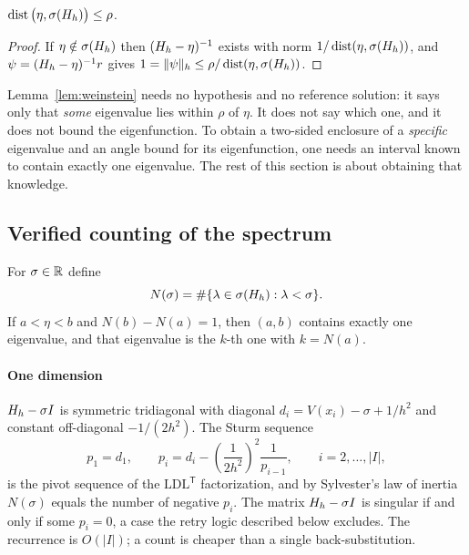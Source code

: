 \begin{lemma}\label{lem:weinstein}
  $\operatorname{dist}\big(\eta,\sigma(H_h)\big)\le \rho$.
\end{lemma}
\begin{proof}
  If $\eta\notin\sigma(H_h)$ then $(H_h-\eta)^{-1}$ exists with norm
  $1/\operatorname{dist}(\eta,\sigma(H_h))$, and
  $\psi=(H_h-\eta)^{-1}r$ gives
  $1=\lVert \psi\rVert_h\le \rho/\operatorname{dist}(\eta,\sigma(H_h))$.
\end{proof}

Lemma~\ref{lem:weinstein} needs no hypothesis and no reference solution: it
says only that \emph{some} eigenvalue lies within $\rho$ of $\eta$. It does
not say which one, and it does not bound the eigenfunction. To obtain a
two-sided enclosure of a \emph{specific} eigenvalue and an angle bound for its
eigenfunction, one needs an interval known to contain exactly one eigenvalue.
The rest of this section is about obtaining that knowledge.

\subsection{Verified counting of the spectrum}
\label{sec:counting}

For $\sigma\in\mathbb{R}$ define
\begin{equation}
  N(\sigma) = \#\{\lambda\in\sigma(H_h): \lambda<\sigma\}.
\end{equation}
If $a<\eta<b$ and $N(b)-N(a)=1$, then $(a,b)$ contains exactly one
eigenvalue, and that eigenvalue is the $k$-th one with $k=N(a)$.

\paragraph{One dimension} $H_h-\sigma I$ is symmetric tridiagonal with
diagonal $d_i=V(x_i)-\sigma+1/h^2$ and constant off-diagonal
$-1/(2h^2)$. The Sturm sequence
\begin{equation}
  p_1=d_1,\qquad
  p_i=d_i-\left(\frac{1}{2h^{2}}\right)^{\!2}\frac{1}{p_{i-1}},\qquad
  i=2,\dots,|I|,
\end{equation}
is the pivot sequence of the $\mathrm{LDL}^{\mathsf T}$ factorization, and by
Sylvester's law of
inertia $N(\sigma)$ equals the number of negative $p_i$. The matrix
$H_h-\sigma I$ is singular if and only if some $p_i=0$, a case the retry
logic described below excludes. The recurrence is $O(|I|)$; a count is
cheaper than a single back-substitution.

